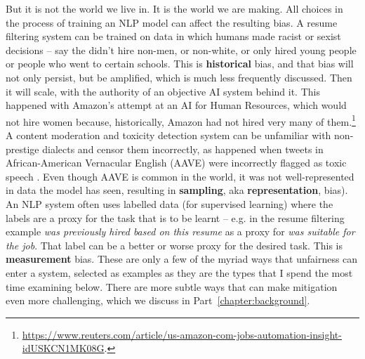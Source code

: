 But it is not the world we live in. It is the world we are making. All choices in the process of training an NLP model can affect the resulting bias. A resume filtering system can be trained on data in which humans made racist or sexist decisions -- say the didn't hire non-men, or non-white, or only hired young people or people who went to certain schools. This is \textbf{historical} bias, and that bias will not only persist, but be amplified, which is much less frequently discussed. Then it will scale, with the authority of an objective AI system behind it. This happened with Amazon's attempt at an AI for Human Resources, which would not hire women because, historically, Amazon had not hired very many of them.\footnote{\url{https://www.reuters.com/article/us-amazon-com-jobs-automation-insight-idUSKCN1MK08G}.} A content moderation and toxicity detection system can be unfamiliar with non-prestige dialects and censor them incorrectly, as happened when tweets in African-American Vernacular English (AAVE) were incorrectly flagged as toxic speech \citep{sap-etal-2019-risk}. Even though AAVE is common in the world, it was not well-represented in data the model has seen, resulting in \textbf{sampling}, aka \textbf{representation}, bias). An NLP system often uses labelled data (for supervised learning) where the labels are a proxy for the task that is to be learnt -- e.g. in the resume filtering example \textit{was previously hired based on this resume} as a proxy for \textit{was suitable for the job}. That label can be a better or worse proxy for the desired task. This is \textbf{measurement} bias. These are only a few of the myriad ways that unfairness can enter a system, selected as examples as they are the types that I spend the most time examining below. There are more subtle ways that can make mitigation even more challenging, which we discuss in Part~\ref{chapter:background}.






